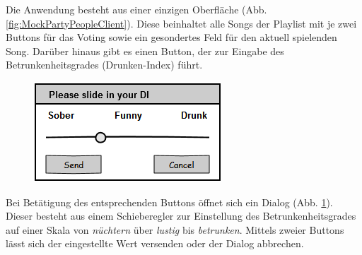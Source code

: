 Die Anwendung besteht aus einer einzigen Oberfläche (Abb. \ref{fig:MockPartyPeopleClient}). Diese beinhaltet alle Songs der Playlist mit je zwei Buttons für das Voting sowie ein gesondertes Feld für den aktuell spielenden Song. Darüber hinaus gibt es einen Button, der zur Eingabe des Betrunkenheitsgrades (Drunken-Index) führt.

\begin{figure}[H]
\centering
\includegraphics[width=0.4\linewidth]{Bilder/MockDiSlider}
\caption{}
\label{fig:MockDiSlider}
\end{figure}

Bei Betätigung des entsprechenden Buttons öffnet sich ein Dialog (Abb. \ref{fig:MockDiSlider}). Dieser besteht aus einem Schieberegler zur Einstellung des Betrunkenheitsgrades auf einer Skala von \textit{nüchtern} über \textit{lustig} bis \textit{betrunken}. Mittels zweier Buttons lässt sich der eingestellte Wert versenden oder der Dialog abbrechen.
 